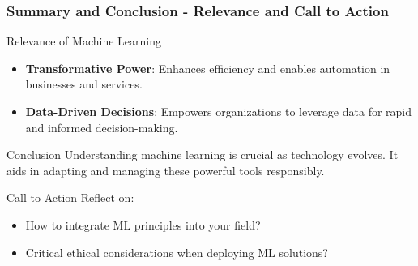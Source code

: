 \documentclass[aspectratio=169]{beamer}
\begin{document}
\begin{frame}[fragile]
    \frametitle{Summary and Conclusion - Relevance and Call to Action}
    \begin{block}{Relevance of Machine Learning}
        \begin{itemize}
            \item \textbf{Transformative Power}: Enhances efficiency and enables automation in businesses and services.
            \item \textbf{Data-Driven Decisions}: Empowers organizations to leverage data for rapid and informed decision-making.
        \end{itemize}
    \end{block}

    \begin{block}{Conclusion}
        Understanding machine learning is crucial as technology evolves. It aids in adapting and managing these powerful tools responsibly.
    \end{block}

    \begin{block}{Call to Action}
        Reflect on:
        \begin{itemize}
            \item How to integrate ML principles into your field?
            \item Critical ethical considerations when deploying ML solutions?
        \end{itemize}
    \end{block}
\end{frame}
\end{document}

